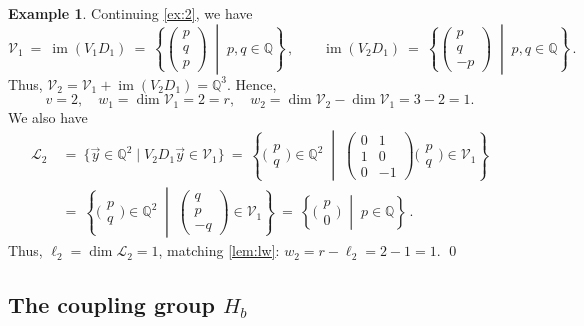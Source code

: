 \documentclass{lmcs}
\theoremstyle{definition}
\newtheorem{example}[thm]{Example}
\DeclareMathOperator{\im}{im}
\newcommand{\cL}{\mathcal{L}}
\newcommand{\Q}{\mathbb{Q}}
\newcommand{\V}{\mathcal{V}}
\begin{document}
\begin{example} \label{ex:3}
Continuing \cref{ex:2}, we have
\[
\V_1 \ = \ \im(V_1 D_1) \ = \ \left\{\left(\begin{smallmatrix}p \\ q \\ p \end{smallmatrix}\right) \;\middle\vert\; p,q \in \Q \right\}\,, \qquad \im(V_2 D_1) \ = \ \left\{\left(\begin{smallmatrix}p \\ q \\ -p \end{smallmatrix}\right) \;\middle\vert\; p,q \in \Q \right\}\,.
\]
Thus, $\V_2 = \V_1 + \im(V_2 D_1) = \Q^3$.
Hence,
\[
 v = 2, \quad w_1 = \dim \V_1 = 2 = r, \quad w_2 = \dim \V_2 - \dim \V_1 = 3 - 2 = 1.
\]
We also have
\begin{align*}
\cL_2 \ 
&= \ \{\vec{y} \in \Q^2 \mid V_2 D_1 \vec{y} \in \V_1\}
 \ = \  \left\{\big(\begin{smallmatrix}p \\ q \end{smallmatrix}\big) \in \Q^2 \;\middle\vert\; \left(\begin{smallmatrix}0&1\\1&0\\0&-1\end{smallmatrix}\right) \big(\begin{smallmatrix}p \\ q \end{smallmatrix}\big) \in \V_1\right\} \\
&= \  \left\{\big(\begin{smallmatrix}p \\ q \end{smallmatrix}\big) \in \Q^2 \;\middle\vert\; \left(\begin{smallmatrix}q \\ p \\ -q\end{smallmatrix}\right)  \in \V_1\right\}
\ = \ \left\{\big(\begin{smallmatrix}p \\ 0 \end{smallmatrix}\big) \;\middle\vert\; p \in \Q\right\}\,.
\end{align*}
Thus, $\ell_2 = \dim \cL_2 = 1$, matching \cref{lem:lw}: $w_2 = r-\ell_2 =2-1 = 1$.
\qed
\end{example}

\subsection{The coupling group \texorpdfstring{$H_b$}{Hb}} \label{sub:Hb}
\end{document}
